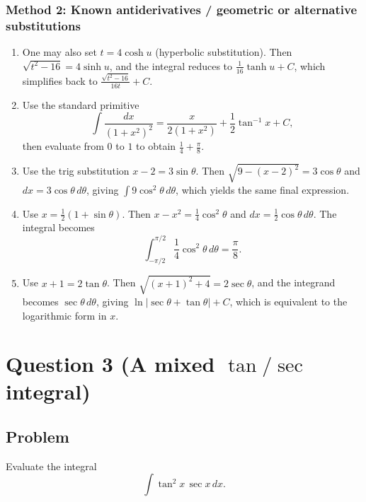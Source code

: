 \documentclass[12pt]{article}
\begin{document}
\subsubsection*{Method 2: Known antiderivatives / geometric or alternative substitutions}

\begin{enumerate}[label=(\alph*)]
\item One may also set \(t=4\cosh u\) (hyperbolic substitution). Then \(\sqrt{t^{2}-16}=4\sinh u\), and the integral reduces to \(\frac{1}{16}\tanh u + C\), which simplifies back to \(\frac{\sqrt{t^{2}-16}}{16t}+C\).

\item Use the standard primitive
\[
\int \frac{dx}{(1+x^{2})^{2}}
=\frac{x}{2(1+x^{2})}+\frac{1}{2}\tan^{-1}x + C,
\]
then evaluate from \(0\) to \(1\) to obtain \(\frac{1}{4}+\frac{\pi}{8}\).

\item Use the trig substitution \(x-2=3\sin\theta\). Then \(\sqrt{9-(x-2)^{2}}=3\cos\theta\) and \(dx=3\cos\theta\,d\theta\), giving \(\int 9\cos^{2}\theta\,d\theta\), which yields the same final expression.

\item Use \(x=\frac{1}{2}(1+\sin\theta)\). Then \(x-x^{2}=\frac{1}{4}\cos^{2}\theta\) and \(dx=\frac{1}{2}\cos\theta\,d\theta\). The integral becomes
\[
\int_{-\pi/2}^{\pi/2}\frac{1}{4}\cos^{2}\theta\,d\theta=\frac{\pi}{8}.
\]

\item Use \(x+1=2\tan\theta\). Then \(\sqrt{(x+1)^{2}+4}=2\sec\theta\), and the integrand becomes \(\sec\theta\,d\theta\), giving \(\ln|\sec\theta+\tan\theta|+C\), which is equivalent to the logarithmic form in \(x\).
\end{enumerate}

\newpage


\section*{Question 3 (A mixed \(\tan/\sec\) integral)}

\subsection*{Problem}
Evaluate the integral
\[
\int \tan^{2}x\,\sec x\,dx.
\]
\end{document}
